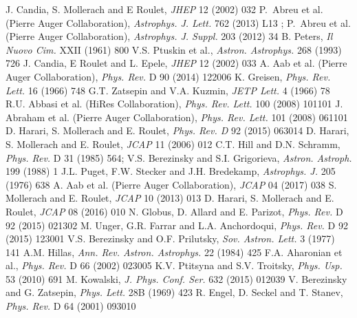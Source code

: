 \documentclass[twoside,12pt]{article}
\begin{document}
\begin{thebibliography}{99}
 J. Candia, S. Mollerach and E Roulet, {\it JHEP} 12 (2002) 032  %
  P.~Abreu et al. (Pierre Auger Collaboration), {\it Astrophys. J. Lett.} 762 (2013) L13 ; P.~Abreu et al. (Pierre Auger Collaboration), {\it Astrophys. J.  Suppl.} 203 (2012) 34
 B. Peters, {\it Il Nuovo Cim.} XXII (1961) 800   %
 V.S. Ptuskin et al., {\it Astron. Astrophys.} 268 (1993) 726  %
  J. Candia, E Roulet and L. Epele, {\it JHEP} 12 (2002) 033
 A. Aab et al. (Pierre Auger Collaboration), {\it Phys. Rev.} D 90 (2014) 122006 %
 K. Greisen, {\it  Phys. Rev. Lett.} 16 (1966)  748 
  G.T. Zatsepin and V.A. Kuzmin, {\it JETP Lett.} 4 (1966) 78
 R.U. Abbasi et al. (HiRes Collaboration), {\it Phys. Rev. Lett.} 100 (2008) 101101
 J. Abraham et al. (Pierre Auger Collaboration), {\it Phys. Rev. Lett.} 101 (2008) 061101
 D. Harari, S. Mollerach and E. Roulet, {\it Phys. Rev. D} 92 (2015) 063014 %
 D. Harari, S. Mollerach and E. Roulet, {\it JCAP} 11 (2006) 012  %
 C.T. Hill and D.N. Schramm, {\it Phys. Rev.} D 31 (1985) 564; V.S. Berezinsky and S.I. Grigorieva, {\it Astron. Astroph.} 199 (1988) 1    %
 J.L. Puget, F.W. Stecker and J.H. Bredekamp, {\it Astrophys. J.} 205 (1976) 638
 A. Aab et al. (Pierre Auger Collaboration), {\it JCAP} 04 (2017) 038 %
 S. Mollerach and E. Roulet, {\it JCAP} 10 (2013) 013   %
 D. Harari, S. Mollerach and E. Roulet, {\it JCAP} 08 (2016) 010 %
 N. Globus, D. Allard and E. Parizot, {\it Phys. Rev.} D 92 (2015) 021302   %
 M. Unger, G.R. Farrar and L.A. Anchordoqui, {\it Phys. Rev.} D 92 (2015) 123001  %
 V.S. Berezinsky and O.F. Prilutsky, {\it Sov. Astron. Lett.} 3 (1977) 141  %
 A.M. Hillas, {\it Ann. Rev. Astron. Astrophys.} 22 (1984) 425
 F.A. Aharonian et al., {\it Phys. Rev.} D 66 (2002) 023005
 K.V. Ptitsyna and S.V. Troitsky, {\it  Phys. Usp.} 53 (2010) 691  %
 M. Kowalski, {\it J. Phys. Conf. Ser.} 632 (2015) 012039
 V. Berezinsky and G. Zatsepin, {\it Phys. Lett.} 28B (1969) 423   %
 R. Engel, D. Seckel and T. Stanev, {\it Phys. Rev.} D 64 (2001) 093010 %

\end{thebibliography}
\end{document}
